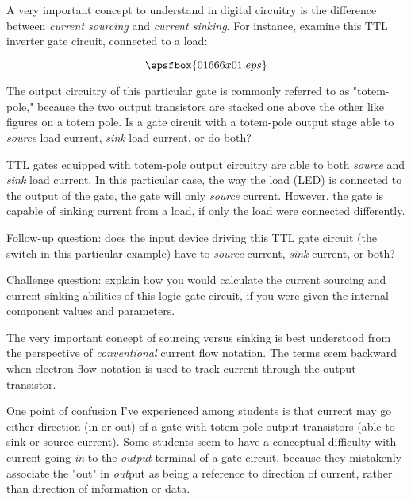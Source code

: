 

A very important concept to understand in digital circuitry is the difference between {\it current sourcing} and {\it current sinking}.  For instance, examine this TTL inverter gate circuit, connected to a load:

$$\epsfbox{01666x01.eps}$$

The output circuitry of this particular gate is commonly referred to as "totem-pole," because the two output transistors are stacked one above the other like figures on a totem pole.  Is a gate circuit with a totem-pole output stage able to {\it source} load current, {\it sink} load current, or do both?







TTL gates equipped with totem-pole output circuitry are able to both {\it source} and {\it sink} load current.  In this particular case, the way the load (LED) is connected to the output of the gate, the gate will only {\it source} current.  However, the gate is capable of sinking current from a load, if only the load were connected differently.

\vskip 10pt

Follow-up question: does the input device driving this TTL gate circuit (the switch in this particular example) have to {\it source} current, {\it sink} current, or both?

\vskip 10pt

Challenge question: explain how you would calculate the current sourcing and current sinking abilities of this logic gate circuit, if you were given the internal component values and parameters.







The very important concept of sourcing versus sinking is best understood from the perspective of {\it conventional} current flow notation.  The terms seem backward when electron flow notation is used to track current through the output transistor.

One point of confusion I've experienced among students is that current may go either direction (in or out) of a gate with totem-pole output transistors (able to sink or source current).  Some students seem to have a conceptual difficulty with current going {\it in} to the {\it output} terminal of a gate circuit, because they mistakenly associate the "out" in {\it out}put as being a reference to direction of current, rather than direction of information or data.

